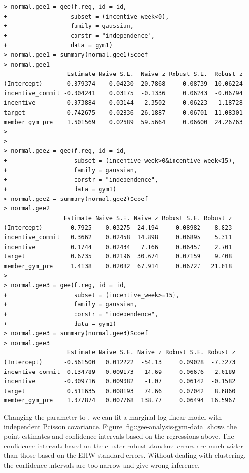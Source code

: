 \begin{lstlisting}
> normal.gee1 = gee(f.reg, id = id, 
+                  subset = (incentive_week<0),
+                  family = gaussian, 
+                  corstr = "independence", 
+                  data = gym1)
> normal.gee1 = summary(normal.gee1)$coef
> normal.gee1
                  Estimate Naive S.E.  Naive z Robust S.E.  Robust z
(Intercept)      -0.879374    0.04230 -20.7868     0.08739 -10.06224
incentive_commit -0.004241    0.03175  -0.1336     0.06243  -0.06794
incentive        -0.073884    0.03144  -2.3502     0.06223  -1.18728
target            0.742675    0.02836  26.1887     0.06701  11.08301
member_gym_pre    1.601569    0.02689  59.5664     0.06600  24.26763
>  
> 
> normal.gee2 = gee(f.reg, id = id, 
+                   subset = (incentive_week>0&incentive_week<15),
+                   family = gaussian, 
+                   corstr = "independence", 
+                   data = gym1)
> normal.gee2 = summary(normal.gee2)$coef  
> normal.gee2
                 Estimate Naive S.E. Naive z Robust S.E. Robust z
(Intercept)       -0.7925    0.03275 -24.194     0.08982   -8.823
incentive_commit   0.3662    0.02458  14.898     0.06895    5.311
incentive          0.1744    0.02434   7.166     0.06457    2.701
target             0.6735    0.02196  30.674     0.07159    9.408
member_gym_pre     1.4138    0.02082  67.914     0.06727   21.018
> 
> normal.gee3 = gee(f.reg, id = id, 
+                   subset = (incentive_week>=15),
+                   family = gaussian, 
+                   corstr = "independence", 
+                   data = gym1)
> normal.gee3 = summary(normal.gee3)$coef
> normal.gee3
                  Estimate Naive S.E. Naive z Robust S.E. Robust z
(Intercept)      -0.661500   0.012222  -54.13     0.09028  -7.3273
incentive_commit  0.134789   0.009173   14.69     0.06676   2.0189
incentive        -0.009716   0.009082   -1.07     0.06142  -0.1582
target            0.611635   0.008193   74.66     0.07042   8.6860
member_gym_pre    1.077874   0.007768  138.77     0.06494  16.5967
\end{lstlisting} 

Changing the  parameter to , we can fit a marginal log-linear model with independent Poisson covariance. Figure \ref{fig::gee-analysis-gym-data} shows the point estimates and confidence intervals based on the regressions above. The confidence intervals based on the cluster-robust standard errors are much wider than those based on the EHW standard errors. Without dealing with clustering, the confidence intervals are too narrow and give wrong inference.

